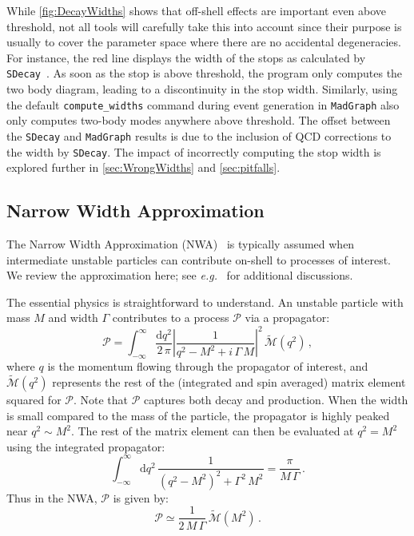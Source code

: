 \documentclass[a4paper,12pt]{article}
\begin{document}
While \cref{fig:DecayWidths} shows that off-shell effects are important even above threshold, not all tools will carefully take this into account since their purpose is usually to cover the parameter space where there are no accidental degeneracies. For instance, the red line displays the width of the stops as calculated by \texttt{SDecay}~\cite{Muhlleitner:2003vg}. As soon as the stop is above threshold, the program only computes the two body diagram, leading to a discontinuity in the stop width. Similarly, using the default \texttt{compute\_widths} command during event generation in \texttt{MadGraph} also only computes two-body modes anywhere above threshold. The offset between the \texttt{SDecay} and \texttt{MadGraph} results is due to the inclusion of QCD corrections to the width by \texttt{SDecay}. The impact of incorrectly computing the stop width is explored further in \cref{sec:WrongWidths} and \cref{sec:pitfalls}.


\subsection{Narrow Width Approximation}
\label{sec:NWA}

The Narrow Width Approximation (NWA)~\cite{Veltman:1963th, Dicus:1984fu} is typically assumed when intermediate unstable particles can contribute on-shell to processes of interest. We review the approximation here; see \emph{e.g.}~\cite{Veltman:1963th,Dicus:1984fu,Berdine:2007uv,Kauer:2007zc,Uhlemann:2008pm} for additional discussions.

The essential physics is straightforward to understand.  An unstable particle with mass $M$ and width $\Gamma$ contributes to a process $\mathcal{P}$ via a propagator:
\begin{equation}
\mathcal{P} = \int_{-\infty}^\infty \frac{\text{d}q^2}{2\,\pi}\left|\frac{1}{q^2 - M^2 + i\,\Gamma\,M} \right|^2\, \widetilde{\mathcal{M}}(q^2)\, ,
\end{equation}
where $q$ is the momentum flowing through the propagator of interest, and $\widetilde{\mathcal{M}}(q^2)$ represents the rest of the (integrated and spin averaged) matrix element squared for $\mathcal{P}$. Note that $\mathcal{P}$ captures both decay and production. When the width is small compared to the mass of the particle, the propagator is highly peaked near $q^2 \sim M^2$. The rest of the matrix element can then be evaluated at $q^2 = M^2$ using the integrated propagator:
\begin{equation}
\int_{-\infty}^\infty \text{d}q^2\,\frac{1}{(q^2 - M^2)^2 + \Gamma^2\, M^2}  = \frac{\pi}{M\,\Gamma}\,.
\end{equation}
Thus in the NWA, $\mathcal{P}$ is given by:
\begin{equation}
\mathcal{P}  
 \simeq \frac{1}{2\,M\,\Gamma} \,\widetilde{\mathcal{M}}(M^2) \, .
\label{eq:NWAeq}
\end{equation}
\end{document}
